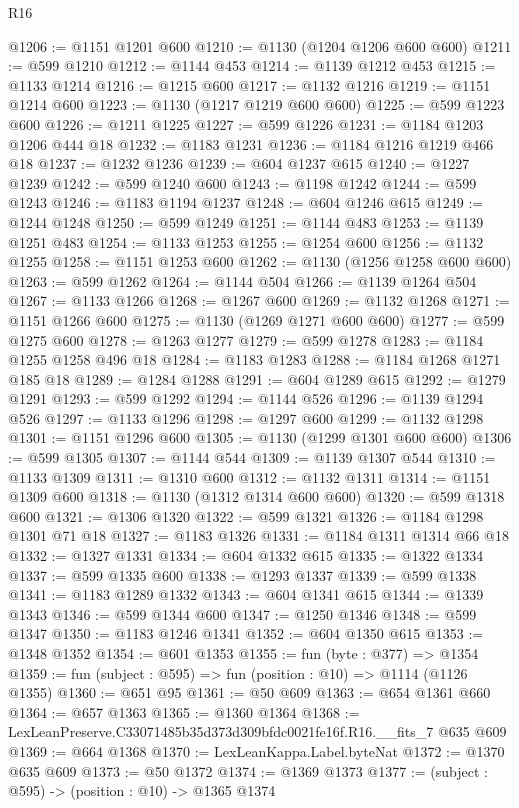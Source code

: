 \begin{lexlean}{R16}
\begin{coremodule}
@1206 := @1151 @1201 @600
@1210 := @1130 (@1204 @1206 @600 @600)
@1211 := @599 @1210
@1212 := @1144 @453
@1214 := @1139 @1212 @453
@1215 := @1133 @1214
@1216 := @1215 @600
@1217 := @1132 @1216
@1219 := @1151 @1214 @600
@1223 := @1130 (@1217 @1219 @600 @600)
@1225 := @599 @1223 @600
@1226 := @1211 @1225
@1227 := @599 @1226
@1231 := @1184 @1203 @1206 @444 @18
@1232 := @1183 @1231
@1236 := @1184 @1216 @1219 @466 @18
@1237 := @1232 @1236
@1239 := @604 @1237 @615
@1240 := @1227 @1239
@1242 := @599 @1240 @600
@1243 := @1198 @1242
@1244 := @599 @1243
@1246 := @1183 @1194 @1237
@1248 := @604 @1246 @615
@1249 := @1244 @1248
@1250 := @599 @1249
@1251 := @1144 @483
@1253 := @1139 @1251 @483
@1254 := @1133 @1253
@1255 := @1254 @600
@1256 := @1132 @1255
@1258 := @1151 @1253 @600
@1262 := @1130 (@1256 @1258 @600 @600)
@1263 := @599 @1262
@1264 := @1144 @504
@1266 := @1139 @1264 @504
@1267 := @1133 @1266
@1268 := @1267 @600
@1269 := @1132 @1268
@1271 := @1151 @1266 @600
@1275 := @1130 (@1269 @1271 @600 @600)
@1277 := @599 @1275 @600
@1278 := @1263 @1277
@1279 := @599 @1278
@1283 := @1184 @1255 @1258 @496 @18
@1284 := @1183 @1283
@1288 := @1184 @1268 @1271 @185 @18
@1289 := @1284 @1288
@1291 := @604 @1289 @615
@1292 := @1279 @1291
@1293 := @599 @1292
@1294 := @1144 @526
@1296 := @1139 @1294 @526
@1297 := @1133 @1296
@1298 := @1297 @600
@1299 := @1132 @1298
@1301 := @1151 @1296 @600
@1305 := @1130 (@1299 @1301 @600 @600)
@1306 := @599 @1305
@1307 := @1144 @544
@1309 := @1139 @1307 @544
@1310 := @1133 @1309
@1311 := @1310 @600
@1312 := @1132 @1311
@1314 := @1151 @1309 @600
@1318 := @1130 (@1312 @1314 @600 @600)
@1320 := @599 @1318 @600
@1321 := @1306 @1320
@1322 := @599 @1321
@1326 := @1184 @1298 @1301 @71 @18
@1327 := @1183 @1326
@1331 := @1184 @1311 @1314 @66 @18
@1332 := @1327 @1331
@1334 := @604 @1332 @615
@1335 := @1322 @1334
@1337 := @599 @1335 @600
@1338 := @1293 @1337
@1339 := @599 @1338
@1341 := @1183 @1289 @1332
@1343 := @604 @1341 @615
@1344 := @1339 @1343
@1346 := @599 @1344 @600
@1347 := @1250 @1346
@1348 := @599 @1347
@1350 := @1183 @1246 @1341
@1352 := @604 @1350 @615
@1353 := @1348 @1352
@1354 := @601 @1353
@1355 := fun (byte : @377) => @1354
@1359 := fun (subject : @595) => fun (position : @10) => @1114 (@1126 @1355)
@1360 := @651 @95
@1361 := @50 @609
@1363 := @654 @1361 @660
@1364 := @657 @1363
@1365 := @1360 @1364
@1368 := LexLeanPreserve.C33071485b35d373d309bfdc0021fe16f.R16.__fits_7 @635 @609
@1369 := @664 @1368
@1370 := LexLeanKappa.Label.byteNat
@1372 := @1370 @635 @609
@1373 := @50 @1372
@1374 := @1369 @1373
@1377 := (subject : @595) -> (position : @10) -> @1365 @1374

\end{coremodule}
\end{lexlean}
